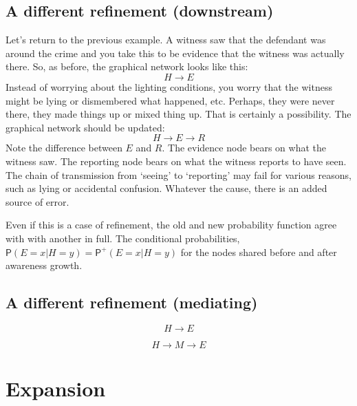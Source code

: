 \documentclass[
  11pt,
  dvipsnames,enabledeprecatedfontcommands]{scrartcl}
\newcommand{\pr}[1]{\ensuremath{\mathsf{P}(#1)}}
\newcommand{\ppr}[2]{\ensuremath{\mathsf{P}^{#1}(#2)}}
\begin{document}
\hypertarget{a-different-refinement-downstream}{%
\subsection{A different refinement
(downstream)}\label{a-different-refinement-downstream}}

Let's return to the previous example. A witness saw that the defendant
was around the crime and you take this to be evidence that the witness
was actually there. So, as before, the graphical network looks like
this: \[H\rightarrow E\] Instead of worrying about the lighting
conditions, you worry that the witness might be lying or dismembered
what happened, etc. Perhaps, they were never there, they made things up
or mixed thing up. That is certainly a possibility. The graphical
network should be updated: \[H\rightarrow E \rightarrow R\] Note the
difference between \(E\) and \(R\). The evidence node bears on what the
witness saw. The reporting node bears on what the witness reports to
have seen. The chain of transmission from `seeing' to `reporting' may
fail for various reasons, such as lying or accidental confusion.
Whatever the cause, there is an added source of error.

Even if this is a case of
refinement, the old and new
probability function agree with with another in full. The conditional
probabilities, \(\pr{E=x \vert H=y}=\ppr{+}{E=x \vert H=y}\) for the
nodes shared before and after awareness growth.

\hypertarget{a-different-refinement-mediating}{%
\subsection{A different refinement
(mediating)}\label{a-different-refinement-mediating}}

\[H\rightarrow E\]

\[H\rightarrow M \rightarrow E\]

\hypertarget{expansion}{%
\section{Expansion}\label{expansion}}
\end{document}
